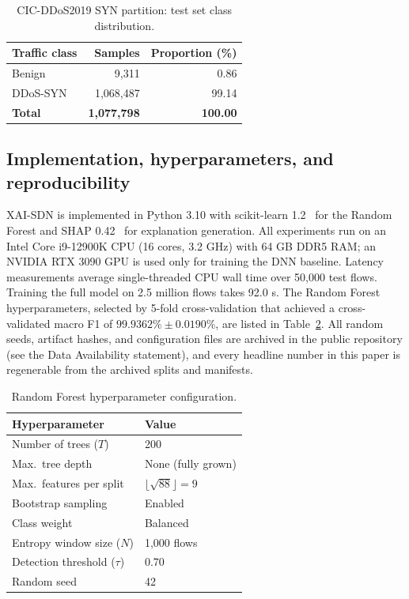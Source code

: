 ﻿\documentclass[review,12pt]{elsarticle}
\begin{document}
\begin{table}[!t]
\centering
\caption{CIC-DDoS2019 SYN partition: test set class distribution.}
\label{tab:dataset}
\begin{tabular}{@{}lrr@{}}
\toprule
\textbf{Traffic class} & \textbf{Samples} & \textbf{Proportion (\%)} \\
\midrule
Benign & 9,311 & 0.86 \\
DDoS-SYN & 1,068,487 & 99.14 \\
\midrule
\textbf{Total} & \textbf{1,077,798} & \textbf{100.00} \\
\bottomrule
\end{tabular}
\end{table}

\subsection{Implementation, hyperparameters, and reproducibility}
XAI-SDN is implemented in Python 3.10 with scikit-learn 1.2~\cite{pedregosa2011sklearn} for the Random Forest and SHAP 0.42~\cite{lundberg2017shap} for explanation generation. All experiments run on an Intel Core i9-12900K CPU (16 cores, 3.2 GHz) with 64 GB DDR5 RAM; an NVIDIA RTX 3090 GPU is used only for training the DNN baseline. Latency measurements average single-threaded CPU wall time over 50,000 test flows. Training the full model on 2.5 million flows takes 92.0 s. The Random Forest hyperparameters, selected by 5-fold cross-validation that achieved a cross-validated macro F1 of $99.9362\% \pm 0.0190\%$, are listed in Table~\ref{tab:hyperparams}. All random seeds, artifact hashes, and configuration files are archived in the public repository (see the Data Availability statement), and every headline number in this paper is regenerable from the archived splits and manifests.

\begin{table}[!t]
\centering
\caption{Random Forest hyperparameter configuration.}
\label{tab:hyperparams}
\begin{tabular}{@{}ll@{}}
\toprule
\textbf{Hyperparameter} & \textbf{Value} \\
\midrule
Number of trees ($T$) & 200 \\
Max.\ tree depth & None (fully grown) \\
Max.\ features per split & $\lfloor\sqrt{88}\rfloor = 9$ \\
Bootstrap sampling & Enabled \\
Class weight & Balanced \\
Entropy window size ($N$) & 1,000 flows \\
Detection threshold ($\tau$) & 0.70 \\
Random seed & 42 \\
\bottomrule
\end{tabular}
\end{table}
\end{document}
